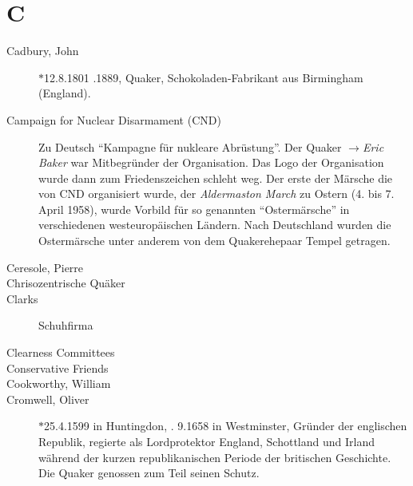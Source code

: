 \section*{C}

\articlesize

\begin{description}

 \item[Cadbury, John] $\ast$12.8.1801 .1889, Quaker, Schokoladen-Fabrikant aus Birmingham (England).

 \item[Campaign for Nuclear Disarmament (CND)] Zu Deutsch ``Kampagne für nukleare Abrüstung''. Der Quaker $\to$\textit{Eric Baker} war Mitbegründer der Organisation. Das Logo der Organisation wurde dann zum Friedenszeichen schleht weg. Der erste der Märsche die von CND organisiert wurde, der \textit{Aldermaston March} zu Ostern (4. bis 7. April 1958), wurde Vorbild für so genannten ``Ostermärsche'' in verschiedenen westeuropäischen Ländern. Nach Deutschland wurden die Ostermärsche unter anderem von dem Quakerehepaar Tempel getragen.

 \item[Ceresole, Pierre]

 \item[Chrisozentrische Quäker]

 \item[Clarks] Schuhfirma
 
 \item[Clearness Committees]


 \item[Conservative Friends]

 \item[Cookworthy, William]

 \item[Cromwell, Oliver] $\ast$25.4.1599 in Huntingdon, . 9.1658 in Westminster, Gründer der englischen Republik, regierte als Lordprotektor England, Schottland und Irland während der kurzen republikanischen Periode der britischen Geschichte. Die Quaker genossen zum Teil seinen Schutz.

 \end{description}

\normalsize